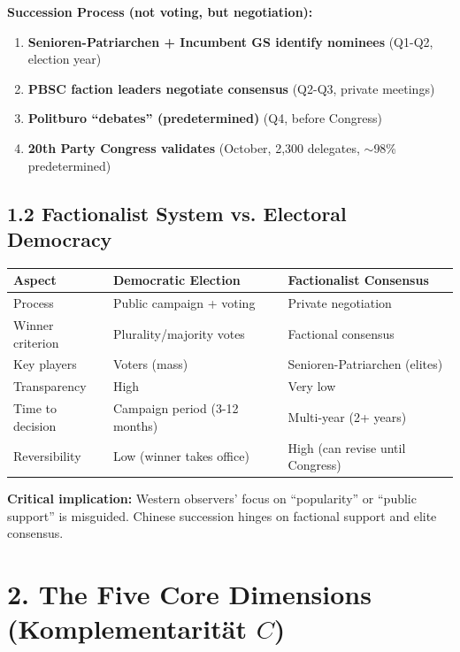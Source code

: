 \documentclass[11pt]{article}
\begin{document}
\textbf{Succession Process (not voting, but negotiation):}

\begin{enumerate}
\item \textbf{Senioren-Patriarchen + Incumbent GS identify nominees} (Q1-Q2, election year)
\item \textbf{PBSC faction leaders negotiate consensus} (Q2-Q3, private meetings)
\item \textbf{Politburo ``debates'' (predetermined)} (Q4, before Congress)
\item \textbf{20th Party Congress validates} (October, 2,300 delegates, $\sim$98\% predetermined)
\end{enumerate}

\subsection{1.2 Factionalist System vs. Electoral Democracy}

\begin{table}[h]
\centering
\begin{tabular}{|l|l|l|}
\hline
\textbf{Aspect} & \textbf{Democratic Election} & \textbf{Factionalist Consensus} \\
\hline
Process & Public campaign + voting & Private negotiation \\
Winner criterion & Plurality/majority votes & Factional consensus \\
Key players & Voters (mass) & Senioren-Patriarchen (elites) \\
Transparency & High & Very low \\
Time to decision & Campaign period (3-12 months) & Multi-year (2+ years) \\
Reversibility & Low (winner takes office) & High (can revise until Congress) \\
\hline
\end{tabular}
\end{table}

\textbf{Critical implication:} Western observers' focus on ``popularity'' or ``public support'' is misguided. Chinese succession hinges on factional support and elite consensus.

\section{2. The Five Core Dimensions (Komplementarität $C$)}
\end{document}
